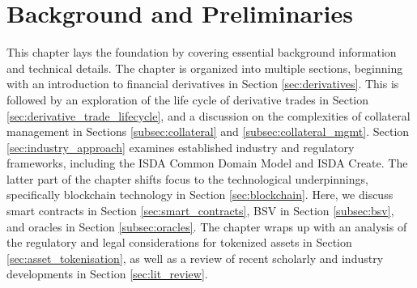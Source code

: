 \chapter{Background and Preliminaries}
\label{ch:Background}
This chapter lays the foundation by covering essential background information and technical details. The chapter is organized into multiple sections, beginning with an introduction to financial derivatives in Section \ref{sec:derivatives}. This is followed by an exploration of the life cycle of derivative trades in Section \ref{sec:derivative_trade_lifecycle}, and a discussion on the complexities of collateral management in Sections \ref{subsec:collateral} and \ref{subsec:collateral_mgmt}. Section \ref{sec:industry_approach} examines established industry and regulatory frameworks, including the ISDA Common Domain Model and ISDA Create. The latter part of the chapter shifts focus to the technological underpinnings, specifically blockchain technology in Section \ref{sec:blockchain}. Here, we discuss smart contracts in Section \ref{sec:smart_contracts}, BSV in Section \ref{subsec:bsv}, and oracles in Section \ref{subsec:oracles}. The chapter wraps up with an analysis of the regulatory and legal considerations for tokenized assets in Section \ref{sec:asset_tokenisation}, as well as a review of recent scholarly and industry developments in Section \ref{sec:lit_review}.